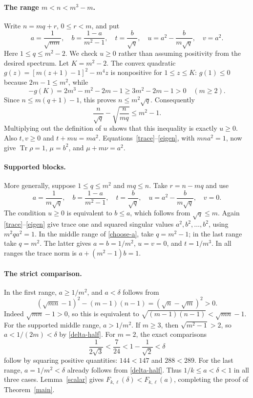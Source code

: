 \documentclass[11pt]{article}
\newcommand{\tr}{\operatorname{Tr}}
\newcommand{\F}{F_{k,\ell}}
\begin{document}
\paragraph{The range $m<n<m^3-m$.}
Write $n=mq+r$, $0\le r<m$, and put
\[
 a=\frac1{\sqrt{mn}},\quad b=\frac{1-a}{m^2-1},\quad
 t=\frac b{\sqrt q},\quad u=a^2-\frac b{m\sqrt q},\quad v=a^2.
\]
Here $1\le q\le m^2-2$. We check $u\ge0$ rather than assuming
positivity from the desired spectrum. Let $K=m^2-2$. The convex quadratic
$g(z)=[m(z+1)-1]^2-m^4z$ is nonpositive for $1\le z\le K$:
$g(1)\le0$ because $2m-1\le m^2$, while
\[
 -g(K)=2m^3-m^2-2m-1\ge3m^2-2m-1>0 \quad(m\ge2).
\]
Since $n\le m(q+1)-1$, this proves $n\le m^2\sqrt q$.
Consequently
\[
 \frac n{\sqrt q}-\sqrt{\frac n{mq}}\le m^2-1.
\]
Multiplying out the definition of $u$ shows that this inequality is exactly
$u\ge0$. Also $t,v\ge0$ and $t+mu=ma^2$.
Equations~\eqref{trace}--\eqref{eigen}, with $mn a^2=1$, now give
$\tr\rho=1$, $\mu=b^2$, and $\mu+m\nu=a^2$.

\paragraph{Supported blocks.}
More generally, suppose $1\le q\le m^2$ and $mq\le n$.
Take $r=n-mq$ and use
\[
 a=\frac1{m\sqrt q},\quad b=\frac{1-a}{m^2-1},\quad
 t=\frac b{\sqrt q},\quad u=a^2-\frac b{m\sqrt q},\quad v=0.
\]
The condition $u\ge0$ is equivalent to $b\le a$, which follows from
$\sqrt q\le m$. Again \eqref{trace}--\eqref{eigen} give trace one and
squared singular values $a^2,b^2,\ldots,b^2$, using $m^2q a^2=1$.
In the middle range of \eqref{choose-a}, take $q=m^2-1$; in the last
range take $q=m^2$. The latter gives $a=b=1/m^2$, $u=v=0$, and
$t=1/m^3$. In all ranges the trace norm is $a+(m^2-1)b=1$.

\paragraph{The strict comparison.}
In the first range, $a\ge1/m^2$, and $a<\delta$ follows from
\[
 (\sqrt{mn}-1)^2-(m-1)(n-1)=(\sqrt n-\sqrt m)^2>0.
\]
Indeed $\sqrt{mn}-1>0$, so this is equivalent to
$\sqrt{(m-1)(n-1)}<\sqrt{mn}-1$.
For the supported middle range, $a>1/m^2$. If $m\ge3$, then
$\sqrt{m^2-1}>2$, so $a<1/(2m)<\delta$ by \eqref{delta-half}.
For $m=2$, the exact comparisons
\[
 \frac1{2\sqrt3}<\frac7{24}<1-\frac1{\sqrt2}<\delta
\]
follow by squaring positive quantities: $144<147$ and $288<289$.
For the last range, $a=1/m^2<\delta$ already follows from
\eqref{delta-half}. Thus $1/k\le a<\delta<1$ in all three cases.
Lemma~\ref{scalar} gives $\F(\delta)<\F(a)$, completing the proof of
Theorem~\ref{main}.
\end{document}
